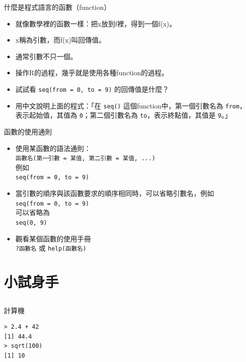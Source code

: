 \documentclass[12pt]{beamer}
\begin{document}
\begin{frame}[fragile]{什麼是程式語言的函數（function）}
\begin{itemize}
\item 就像數學裡的函數一樣：把x放到f裡，得到一個f(x)。
\item x稱為引數，而f(x)叫回傳值。
\item 通常引數不只一個。
\item 操作R的過程，幾乎就是使用各種function的過程。
\item 試試看 \verb+seq(from = 0, to = 9)+ 的回傳值是什麼？
\item 用中文說明上面的程式：「在 \verb+seq()+ 這個function中，第一個引數名為 \verb+from+，表示起始值，其值為 \verb+0+；第二個引數名為 \verb+to+，表示終點值，其值是 \verb+9+。」
\end{itemize}
\end{frame}

\begin{frame}[fragile]{函數的使用通則}
\begin{itemize}
\item 使用某函數的語法通則： \\ \verb+函數名(第一引數 = 某值, 第二引數 = 某值, ...)+ \\
      例如\\
      \verb+seq(from = 0, to = 9)+
\item 當引數的順序與該函數要求的順序相同時，可以省略引數名，例如\\
      \verb+seq(from = 0, to = 9)+\\
      可以省略為 \\
      \verb+seq(0, 9)+
\item 觀看某個函數的使用手冊\\
	\verb+?函數名+ 或 \verb+help(函數名)+
\end{itemize}
\end{frame}


\section{小試身手}\subsection{}

\begin{frame}[fragile]{計算機}
\begin{verbatim}
> 2.4 + 42
[1] 44.4
> sqrt(100)
[1] 10
\end{verbatim}
\end{frame}
\end{document}
